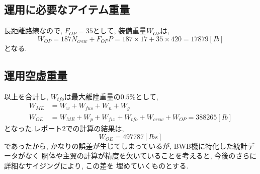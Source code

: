 \documentclass[class=article, crop=false, dvipdfmx, fleqn]{standalone}
\begin{document}
\subsection{運用に必要なアイテム重量}
長距離路線なので, $F_{OP} = 35$として, 装備重量$W_{OP}$は,
\begin{equation}
  W_{OP} = 187N_{crew} + F_{OP}P = 187 \times 17 + 35 \times 420 = 17879 [Ib]
\end{equation}
となる.

\subsection{運用空虚重量}
以上を合計し, $W_{tfo}$は最大離陸重量の$0.5\%$として,
\begin{align}
  W_{ME} &= W_w + W_{fus} + W_{n} + W_{g} \\
  W_{OE} &= W_{ME} + W_p + W_{fix} + W_{tfo} + W_{crew} + W_{OP} = 388265 [Ib]
\end{align}
となった.レポート2での計算の結果は,
\begin{equation}
  W_{OE} = 497787 [Ibs]
\end{equation}
であったから, かなりの誤差が生じてしまっているが, BWB機に特化した統計データがなく
胴体や主翼の計算が精度を欠いていることを考えると, 今後のさらに詳細なサイジングにより, この差を
埋めていくものとする.
\end{document}
